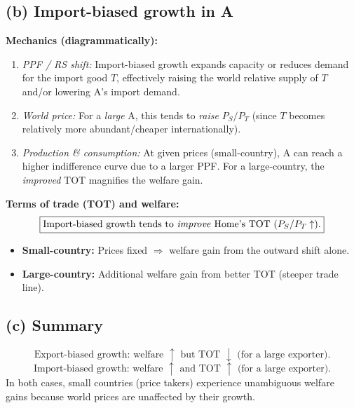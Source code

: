 \documentclass[12pt]{article}
\begin{document}
\subsection*{(b) Import-biased growth in A}
\textbf{Mechanics (diagrammatically):}
\begin{enumerate}[label=\roman*)]
\item \textit{PPF / RS shift:} Import-biased growth expands capacity or reduces demand for the import good $T$, effectively raising the world relative supply of $T$ and/or lowering A's import demand.
\item \textit{World price:} For a \emph{large} A, this tends to \emph{raise} $P_S/P_T$ (since $T$ becomes relatively more abundant/cheaper internationally).
\item \textit{Production \& consumption:} At given prices (small-country), A can reach a higher indifference curve due to a larger PPF. For a large-country, the \emph{improved} TOT magnifies the welfare gain.
\end{enumerate}

\textbf{Terms of trade (TOT) and welfare:}
\[
\boxed{\text{Import-biased growth tends to \emph{improve} Home's TOT }(P_S/P_T \uparrow).}
\]
\begin{itemize}
\item \textbf{Small-country:} Prices fixed $\Rightarrow$ welfare gain from the outward shift alone.
\item \textbf{Large-country:} Additional welfare gain from better TOT (steeper trade line).
\end{itemize}

\subsection*{(c) Summary}
\[
\boxed{\text{Export-biased growth: welfare ${\uparrow}$ but TOT ${\downarrow}$ (for a large exporter).}}
\]
\[
\boxed{\text{Import-biased growth: welfare ${\uparrow}$ and TOT ${\uparrow}$ (for a large exporter).}}
\]
In both cases, small countries (price takers) experience unambiguous welfare gains because world prices are unaffected by their growth.
\end{document}
